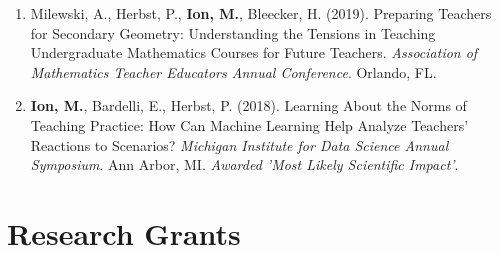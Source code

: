 \documentclass[a4paper,11pt]{article}
\newcommand{\yearsitem}[1]{%
  \item {\reversemarginpar\strut\marginnote{{\small#1}}}%
}
\begin{document}
\begin{enumerate}
\yearsitem{2019}Milewski, A., Herbst, P., \textbf{Ion, M.}, Bleecker, H. (2019). Preparing Teachers for Secondary Geometry: Understanding the Tensions in Teaching Undergraduate Mathematics Courses for Future Teachers. \emph{Association of Mathematics Teacher Educators Annual Conference}. Orlando, FL.

\yearsitem{2018}\textbf{Ion, M.}, Bardelli, E., Herbst, P. (2018). Learning About the Norms of Teaching Practice: How Can Machine Learning Help Analyze Teachers' Reactions to Scenarios? \emph{Michigan Institute for Data Science Annual Symposium}. Ann Arbor, MI. \emph{Awarded 'Most Likely Scientific Impact'}.

\end{enumerate}

\section*{Research Grants}
\end{document}
